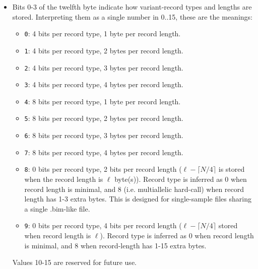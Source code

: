 \documentclass[8pt]{article}
\begin{document}
\begin{itemize}
  \itemsep0em
\item Bits 0-3 of the twelfth byte indicate how variant-record types and
  lengths are stored.  Interpreting them as a single number in 0..15, these are
  the meanings:
  \begin{itemize}
  \item \texttt{0}: 4 bits per record type, 1 byte per record length.
  \item \texttt{1}: 4 bits per record type, 2 bytes per record length.
  \item \texttt{2}: 4 bits per record type, 3 bytes per record length.
  \item \texttt{3}: 4 bits per record type, 4 bytes per record length.
  \item \texttt{4}: 8 bits per record type, 1 byte per record length.
  \item \texttt{5}: 8 bits per record type, 2 bytes per record length.
  \item \texttt{6}: 8 bits per record type, 3 bytes per record length.
  \item \texttt{7}: 8 bits per record type, 4 bytes per record length.
  \item \texttt{8}: 0 bits per record type, 2 bits per record length ($\ell
    -\lceil N/4\rceil$ is stored when the record length is $\ell$ byte(s)).
    Record type is inferred as 0 when record length is minimal, and 8 (i.e.
    multiallelic hard-call) when record length has 1-3 extra bytes.  This is
    designed for single-sample files sharing a single .bim-like file.
  \item \texttt{9}: 0 bits per record type, 4 bits per record length ($\ell
    -\lceil N/4\rceil$ stored when record length is $\ell$).  Record type is
    inferred as 0 when record length is minimal, and 8 when record-length has
    1-15 extra bytes.
  \end{itemize}
  Values 10-15 are reserved for future use.


\end{itemize}
\end{document}
